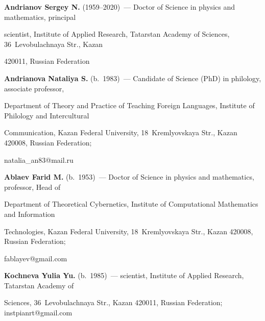 \noindent


\textbf{Andrianov Sergey N.} (1959--2020)~--- Doctor of Science in physics and mathematics, principal 


scientist, Institute of Applied Research, Tatarstan Academy of Sciences, 36~Levobulachnaya Str., Kazan 


420011, Russian Federation





\vspace*{3pt}





\noindent


\textbf{Andrianova Nataliya S.} (b.\ 1983)~--- Candidate of Science (PhD) in philology, associate professor, 


Department of Theory and Practice of Teaching Foreign Languages, Institute of Philology and Intercultural 


Communication, Kazan Federal University, 18~Kremlyovskaya Str., Kazan 420008, Russian Federation; 


\mbox{natalia\_an83@mail.ru} 





\vspace*{3pt}





\noindent


\textbf{Ablaev Farid M.} (b.\ 1953)~--- Doctor of Science in physics and mathematics, professor, Head of 


Department of Theoretical Cybernetics, Institute of Computational Mathematics and Information 


Technologies, Kazan Federal University, 18~Kremlyovskaya Str., Kazan 420008, Russian Federation; 


\mbox{fablayev@gmail.com}





\vspace*{3pt}





\noindent


\textbf{Kochneva Yulia Yu.} (b.\ 1985)~--- scientist, Institute of Applied Research, Tatarstan Academy of 


Sciences, 36~Levobulachnaya Str., Kazan 420011, Russian Federation; \mbox{instpianrt@gmail.com}














\label{end\stat}





\renewcommand{\bibname}{\protect\rm Литература} 



